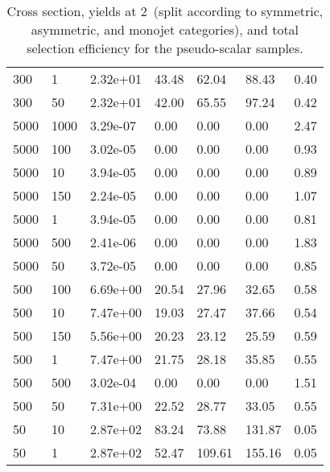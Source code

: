 \begin{table}
\begin{tabular}{lllllll}
300       &   1         &   2.32e+01  &   43.48     &   62.04     &   88.43     &   0.40      \\ 
300       &   50        &   2.32e+01  &   42.00     &   65.55     &   97.24     &   0.42      \\ 
5000      &   1000      &   3.29e-07  &   0.00      &   0.00      &   0.00      &   2.47      \\ 
5000      &   100       &   3.02e-05  &   0.00      &   0.00      &   0.00      &   0.93      \\ 
5000      &   10        &   3.94e-05  &   0.00      &   0.00      &   0.00      &   0.89      \\ 
5000      &   150       &   2.24e-05  &   0.00      &   0.00      &   0.00      &   1.07      \\ 
5000      &   1         &   3.94e-05  &   0.00      &   0.00      &   0.00      &   0.81      \\ 
5000      &   500       &   2.41e-06  &   0.00      &   0.00      &   0.00      &   1.83      \\ 
5000      &   50        &   3.72e-05  &   0.00      &   0.00      &   0.00      &   0.85      \\ 
500       &   100       &   6.69e+00  &   20.54     &   27.96     &   32.65     &   0.58      \\ 
500       &   10        &   7.47e+00  &   19.03     &   27.47     &   37.66     &   0.54      \\ 
500       &   150       &   5.56e+00  &   20.23     &   23.12     &   25.59     &   0.59      \\ 
500       &   1         &   7.47e+00  &   21.75     &   28.18     &   35.85     &   0.55      \\ 
500       &   500       &   3.02e-04  &   0.00      &   0.00      &   0.00      &   1.51      \\ 
500       &   50        &   7.31e+00  &   22.52     &   28.77     &   33.05     &   0.55      \\ 
50        &   10        &   2.87e+02  &   83.24     &   73.88     &   131.87    &   0.05      \\ 
50        &   1         &   2.87e+02  &   52.47     &   109.61    &   155.16    &   0.05      \\ 
\hline
\end{tabular}
\caption{Cross section, yields at 2~\ifb (split according to symmetric, asymmetric, and monojet categories), and total selection efficiency for the pseudo-scalar \DMtt samples.}
\label{tab:dm_DMttP_g1_2fb}
\end{table}
